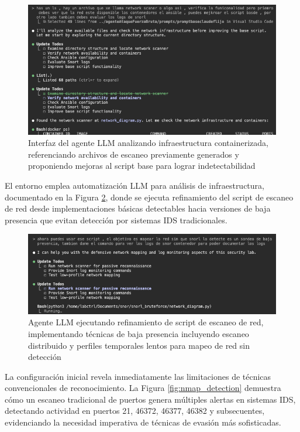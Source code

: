 \begin{figure}[!htbp]
\centering
\includegraphics[width=1\textwidth]{figures/claude_steep1.png}
\caption{Interfaz del agente LLM analizando infraestructura containerizada, referenciando archivos de escaneo previamente generados y proponiendo mejoras al script base para lograr indetectabilidad}
\label{fig:claude_initial_analysis}
\end{figure}

El entorno emplea automatización LLM para análisis de infraestructura, documentado en la Figura \ref{fig:claude_network_refinement}, donde se ejecuta refinamiento del script de escaneo de red desde implementaciones básicas detectables hacia versiones de baja presencia que evitan detección por sistemas IDS tradicionales.

\begin{figure}[!htbp]
\centering
\includegraphics[width=1\textwidth]{figures/claude-stepp2.png}
\caption{Agente LLM ejecutando refinamiento de script de escaneo de red, implementando técnicas de baja presencia incluyendo escaneo distribuido y perfiles temporales lentos para mapeo de red sin detección}
\label{fig:claude_network_refinement}
\end{figure}

La configuración inicial revela inmediatamente las limitaciones de técnicas convencionales de reconocimiento. La Figura \ref{fig:nmap_detection} demuestra cómo un escaneo tradicional de puertos genera múltiples alertas en sistemas IDS, detectando actividad en puertos 21, 46372, 46377, 46382 y subsecuentes, evidenciando la necesidad imperativa de técnicas de evasión más sofisticadas.

